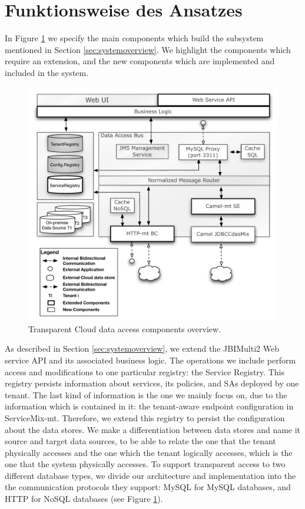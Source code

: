 \section{Funktionsweise des Ansatzes}
\label{sec:FunktionsweiseAnsatz}

In Figure \ref{fig:componentoverview} we specify the main components which build the subsystem mentioned in Section \ref{sec:systemoverview}. We highlight the components which require an extension, and the new components which are implemented and included in the system. 

\begin{figure}[htb]
	\centering
		\includegraphics[clip, scale=0.6]{./gfx/componentoverview.pdf}
	\caption[Transparent Cloud Data Access Components Overview]{Transparent Cloud data access components overview.}
	\label{fig:componentoverview}
\end{figure}

As described in Section \ref{sec:systemoverview}, we extend the JBIMulti2 Web service \ac{API} and its associated business logic. The operations we include perform access and modifications to one particular registry: the Service Registry. This registry persists information about services, its policies, and \ac{SA}s deployed by one tenant. The last kind of information is the one we mainly focus on, due to the information which is contained in it: the tenant-aware endpoint configuration in ServiceMix-mt. Therefore, we extend this registry to persist the configuration about the data stores. We make a differentiation between data stores and name it source and target data sources, to be able to relate the one that the tenant physically accesses and the one which the tenant logically accesses, which is the one that the system physically accesses. To support transparent access to two different database types, we divide our architecture and implementation into the the communication protocols they support: MySQL for MySQL databases, and HTTP for \ac{NoSQL} databases (see Figure \ref{fig:componentoverview}). 

